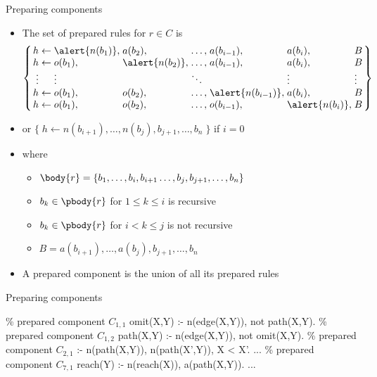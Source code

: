 \begin{frame}{Preparing components}

  \begin{itemize}
  \item The set of \alert{prepared rules} for \(r \in C\) is
    \[\arraycolsep=1.4pt
      \left\{
        \begin{array}{rcllllllll}
               h&\leftarrow&\alert{n(b_1)},&       a(b_2) ,&\dots,&       a(b_{i-1}) ,&       a(b_i), & B      \\
               h&\leftarrow&       o(b_1) ,&\alert{n(b_2)},&\dots,&       a(b_{i-1}) ,&       a(b_i), & B      \\
          \vdots&          &\vdots         &               &\ddots&                   &\vdots         & \vdots \\
               h&\leftarrow&       o(b_1) ,&       o(b_2) ,&\dots,&\alert{n(b_{i-1})},&       a(b_i), & B      \\
               h&\leftarrow&       o(b_1) ,&       o(b_2) ,&\dots,&       o(b_{i-1}) ,&\alert{n(b_i)},& B
        \end{array}
      \right\}
    \]
  \item [] or \quad \(\{\;h \leftarrow n(b_{i+1}), \dots, n(b_j), b_{j+1}, \dots, b_n\;\}\) \quad if \(i=0\)
  \item [] where
    \begin{itemize}
    \item \(\body{r} = \{ b_1, \dots, b_i, b_{i+1} \dots, b_j, b_{j+1}, \dots, b_n \}\)
    \item \(b_k\in\pbody{r}\) for \(1\leq k \leq i\) is recursive
    \item \(b_k\in\pbody{r}\) for \(i< k \leq j\) is not recursive
    \item \(B = a(b_{i+1}), \dots, a(b_j), b_{j+1}, \dots, b_n\)
    \end{itemize}
  \item<2-> A \alert{prepared component} is the union of all its prepared rules
  \end{itemize}
\end{frame}
\begin{frame}[fragile]{Preparing components}
\begin{SemiVerbatim}{.9}
{\color{comment}\% prepared component \(C_{1,1}\)}
omit(X,Y) :- \alert{n(edge(X,Y))}, not path(X,Y).
{\color{comment}\% prepared component \(C_{1,2}\)}
path(X,Y) :- \alert{n(edge(X,Y))}, not omit(X,Y).
{\color{comment}\% prepared component \(C_{2,1}\)}
:- \alert{n(path(X,Y))}, \alert{n(path(X',Y))}, X < X'.
...
{\color{comment}\% prepared component \(C_{7,1}\)}
reach(Y) :- \alert{n(reach(X))}, \alert{a(path(X,Y))}.
...
\end{SemiVerbatim}
\end{frame}
